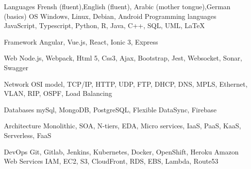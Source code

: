

\begin{cvskills}
  \cvskill
    {Languages } %
    {Frensh  (fluent),English (fluent), Arabic (mother tongue),German (basics)} %
  \cvskill
    {OS} %
    {Windows, Linux, Debian, Android} %
  \cvskill
    {Programming languages} %
    {JavaScript, Typescript, Python, R, Java, C++, SQL, UML, LaTeX} %

  \cvskill
    {Framework} %
    {Angular, Vue.js, React, Ionic 3, Express} %
    

  \cvskill
    {Web} %
    {Node.js, Webpack, Html 5, Css3, Ajax, Bootstrap, Jest, Websocket, Sonar, Swagger} %



  \cvskill
    {Network} %
    {OSI model, TCP/IP, HTTP, UDP, FTP, DHCP, DNS, MPLS, Ethernet, VLAN, RIP, OSPF, Load Balancing   } %

  \cvskill
    {Databases} %
    {mySql, MongoDB, PostgreSQL, Flexible DataSync, Firebase } %

  \cvskill
    {Architecture} %
    {Monolithic, SOA, N-tiers, EDA, Micro services, IaaS, PaaS, KaaS, Serverless, FaaS } %

  \cvskill
    {DevOps} %
    {Git, Gitlab, Jenkins, Kubernetes, Docker, OpenShift, Heroku  } %
\cvskill
    {Amazon Web Services} %
    {IAM, EC2, S3, CloudFront, RDS, EBS, Lambda, Route53 } %


\end{cvskills}
